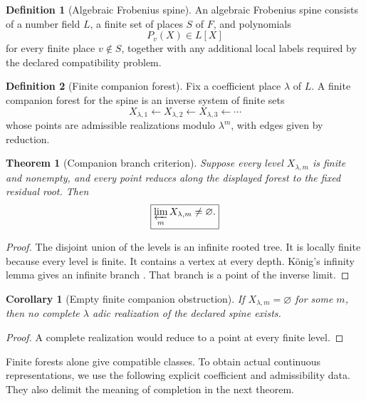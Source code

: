 \documentclass[11pt]{amsart}
\newtheorem{theorem}{Theorem}[section]
\newtheorem{corollary}[corollary]{Corollary}
\theoremstyle{definition}
\newtheorem{definition}[definition]{Definition}
\theoremstyle{remark}
\begin{document}
\begin{definition}[Algebraic Frobenius spine]\label{def:frobenius_spine}
An algebraic Frobenius spine consists of a number field \(L\), a finite set of places \(S\) of \(F\), and polynomials
\[
P_v(X)\in L[X]
\]
for every finite place \(v\notin S\), together with any additional local labels required by the declared compatibility problem.
\end{definition}

\begin{definition}[Finite companion forest]\label{def:companion_forest}
Fix a coefficient place \(\lambda\) of \(L\). A finite companion forest for the spine is an inverse system of finite sets
\[
X_{\lambda,1}
\longleftarrow
X_{\lambda,2}
\longleftarrow
X_{\lambda,3}
\longleftarrow\cdots
\]
whose points are admissible realizations modulo \(\lambda^m\), with edges given by reduction.
\end{definition}

\begin{theorem}[Companion branch criterion]\label{thm:companion_branch_criterion}
Suppose every level \(X_{\lambda,m}\) is finite and nonempty, and every point reduces along the displayed forest to the fixed residual root. Then
\[
\boxed{
\varprojlim_mX_{\lambda,m}
\neq\varnothing.
}
\]
\end{theorem}

\begin{proof}
The disjoint union of the levels is an infinite rooted tree. It is locally finite because every level is finite. It contains a vertex at every depth. König's infinity lemma gives an infinite branch \cite{Diestel2017}. That branch is a point of the inverse limit.
\end{proof}

\begin{corollary}[Empty finite companion obstruction]\label{cor:empty_companion_obstruction}
If \(X_{\lambda,m}=\varnothing\) for some \(m\), then no complete \(\lambda\) adic realization of the declared spine exists.
\end{corollary}

\begin{proof}
A complete realization would reduce to a point at every finite level.
\end{proof}

Finite forests alone give compatible classes. To obtain actual continuous representations, we use the following explicit coefficient and admissibility data. They also delimit the meaning of completion in the next theorem.
\end{document}
